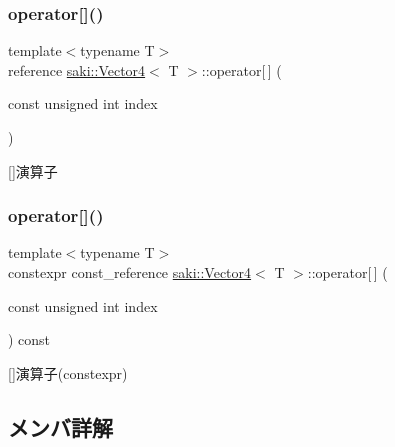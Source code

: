 \subsubsection{\texorpdfstring{operator[]()}{operator[]()}\hspace{0.1cm}{\footnotesize\ttfamily [1/2]}}
{\footnotesize\ttfamily template$<$typename T$>$ \\
reference \mbox{\hyperlink{classsaki_1_1_vector4}{saki\+::\+Vector4}}$<$ T $>$\+::operator\mbox{[}$\,$\mbox{]} (\begin{DoxyParamCaption}\item[{const unsigned int}]{index }\end{DoxyParamCaption})\hspace{0.3cm}{\ttfamily [inline]}}



\mbox{[}\mbox{]}演算子 

\mbox{\label{classsaki_1_1_vector4_a1789c94309f025efd51511f33b539350}} 
\subsubsection{\texorpdfstring{operator[]()}{operator[]()}\hspace{0.1cm}{\footnotesize\ttfamily [2/2]}}
{\footnotesize\ttfamily template$<$typename T$>$ \\
constexpr const\+\_\+reference \mbox{\hyperlink{classsaki_1_1_vector4}{saki\+::\+Vector4}}$<$ T $>$\+::operator\mbox{[}$\,$\mbox{]} (\begin{DoxyParamCaption}\item[{const unsigned int}]{index }\end{DoxyParamCaption}) const\hspace{0.3cm}{\ttfamily [inline]}}



\mbox{[}\mbox{]}演算子(constexpr) 



\subsection{メンバ詳解}
\mbox{\label{classsaki_1_1_vector4_a871d2c114623ae8a76fdfaa61733aebb}} 
